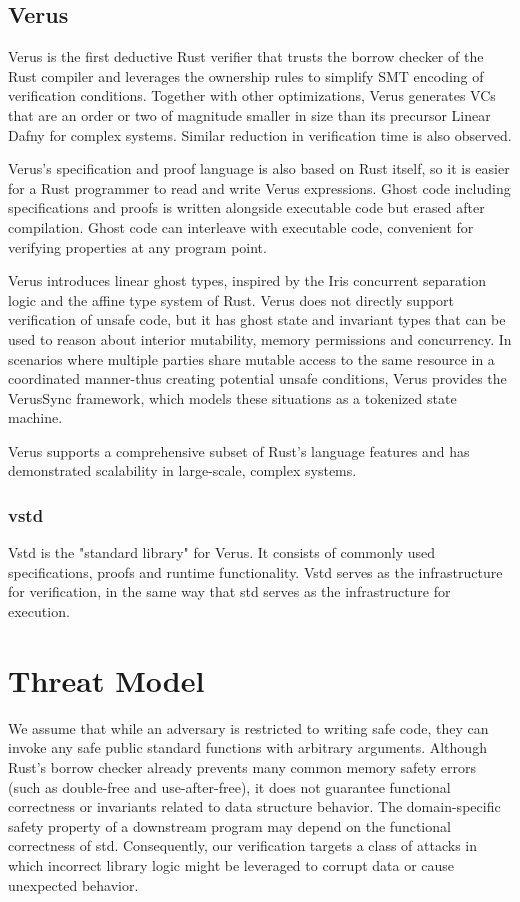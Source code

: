\documentclass[conference]{IEEEtran}
\begin{document}
\subsection{Verus}
Verus\cite{verus} is the first deductive Rust verifier that trusts the borrow checker of the Rust compiler and leverages the ownership rules to simplify SMT encoding of verification conditions. Together with other optimizations, Verus generates VCs that are an order or two of magnitude smaller\cite{VerifyingConcurrentSystemsCode} in size than its precursor Linear Dafny\cite{linearDafny} for complex systems. Similar reduction in verification time is also observed. 

Verus's specification and proof language is also based on Rust itself, so it is easier for a Rust programmer to read and write Verus expressions. Ghost code including specifications and proofs is written alongside executable code but erased after compilation. Ghost code can interleave with executable code, convenient for verifying properties at any program point.   

Verus introduces linear ghost types, inspired by the Iris concurrent separation logic\cite{Iris_contributors_Iris} and the affine type system of Rust. Verus does not directly support verification of unsafe code, but it has ghost state and invariant types that can be used to reason about interior mutability, memory permissions and concurrency. In scenarios where multiple parties share mutable access to the same resource in a coordinated manner-thus creating potential unsafe conditions, Verus provides the VerusSync framework, which models these situations as a tokenized state machine.    

Verus supports a comprehensive subset of Rust's language features and has demonstrated scalability in large-scale, complex systems\cite{verus_publications}.

\subsubsection{vstd}
Vstd is the "standard library" for Verus. It consists of commonly used specifications, proofs and runtime functionality. Vstd serves as the infrastructure for verification, in the same way that std serves as the infrastructure for execution.     

\section{Threat Model}
We assume that while an adversary is restricted to writing safe code, they can invoke any safe public standard functions with arbitrary arguments. Although Rust's borrow checker already prevents many common memory safety errors (such as double-free and use-after-free), it does not guarantee functional correctness or invariants related to data structure behavior. The domain-specific safety property of a downstream program may depend on the functional correctness of std. Consequently, our verification targets a class of attacks in which incorrect library logic might be leveraged to corrupt data or cause unexpected behavior.
\end{document}
